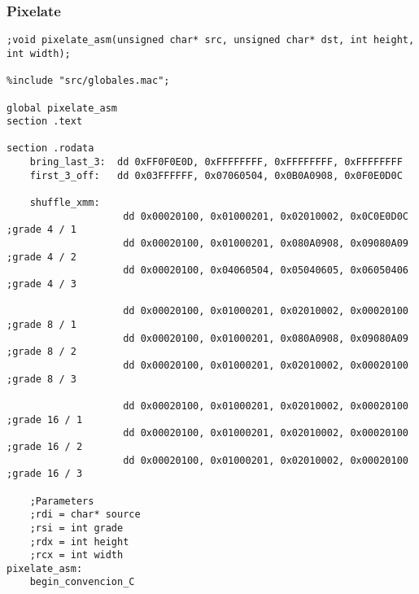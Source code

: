 \subsubsection{Pixelate}
\begin{verbatim}
;void pixelate_asm(unsigned char* src, unsigned char* dst, int height, int width);

%include "src/globales.mac";

global pixelate_asm
section .text

section .rodata
    bring_last_3:  dd 0xFF0F0E0D, 0xFFFFFFFF, 0xFFFFFFFF, 0xFFFFFFFF
    first_3_off:   dd 0x03FFFFFF, 0x07060504, 0x0B0A0908, 0x0F0E0D0C

    shuffle_xmm: 
                    dd 0x00020100, 0x01000201, 0x02010002, 0x0C0E0D0C ;grade 4 / 1
                    dd 0x00020100, 0x01000201, 0x080A0908, 0x09080A09 ;grade 4 / 2
                    dd 0x00020100, 0x04060504, 0x05040605, 0x06050406 ;grade 4 / 3

                    dd 0x00020100, 0x01000201, 0x02010002, 0x00020100 ;grade 8 / 1
                    dd 0x00020100, 0x01000201, 0x080A0908, 0x09080A09 ;grade 8 / 2
                    dd 0x00020100, 0x01000201, 0x02010002, 0x00020100 ;grade 8 / 3

                    dd 0x00020100, 0x01000201, 0x02010002, 0x00020100 ;grade 16 / 1
                    dd 0x00020100, 0x01000201, 0x02010002, 0x00020100 ;grade 16 / 2
                    dd 0x00020100, 0x01000201, 0x02010002, 0x00020100 ;grade 16 / 3

    ;Parameters
    ;rdi = char* source
    ;rsi = int grade
    ;rdx = int height
    ;rcx = int width
pixelate_asm:
    begin_convencion_C


\end{verbatim}

